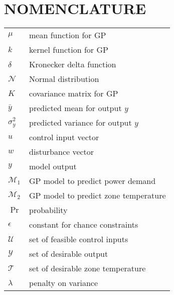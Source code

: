 \section{NOMENCLATURE}
\begin{tabular}{p{12mm}p{55mm}}
  $\mu$        &  mean function for GP \\
  $k$        &  kernel function for GP \\
  $\delta$        &  Kronecker delta function \\
  $\mathcal{N}$ & Normal distribution \\
  $K$        &  covariance matrix for GP \\
  $\bar{y}$        & predicted mean for output \(y\) \\
  $\sigma^2_{y}$        & predicted variance for output \(y\) \\  
  $u$        &  control input vector \\
  $w$        &  disturbance vector \\
  $y$        &  model output \\ 
  $\mathcal{M}_1$        &  GP model to predict power demand\\ 
  $\mathcal{M}_2$        &  GP model to predict zone temperature\\
  $\Pr$ &  probability \\
  $\epsilon$ &  constant for chance constraints \\
  $\mathcal{U}$        &  set of feasible control inputs\\
  $\mathcal{Y}$        &  set of desirable output\\
  $\mathcal{T}$        &  set of desirable zone temperature\\  
  $\lambda$        &  penalty on variance\\   
\end{tabular}